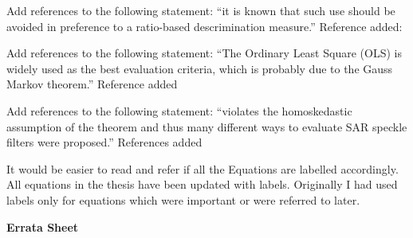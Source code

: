 \replyToComment
    {Add references to the following statement: ``it is known that such use should be avoided in preference to a ratio-based descrimination measure.''}
    {Reference added: \cite{Rignot_1993_TGRS_896}}

\replyToComment
    {Add references to the following statement: ``The Ordinary Least Square (OLS) is widely used as the best evaluation criteria, which is probably due to the Gauss Markov theorem.''}
    {Reference added \cite{Furno_1991_JStatCompSimul}}

\replyToComment
    {Add references to the following statement: ``violates the homoskedastic assumption of the theorem and thus many different ways to evaluate SAR speckle filters were proposed.''}
    {References added \cite{Gagnon_SPIEProc_1997, Argenti_GRSM_2013}}

\replyToComment
    {It would be easier to read and refer if all the Equations are labelled accordingly.}
    {All equations in the thesis have been updated with labels. Originally I had used labels only for equations which were important or were referred to later.}


\textbf{Errata Sheet}
    
